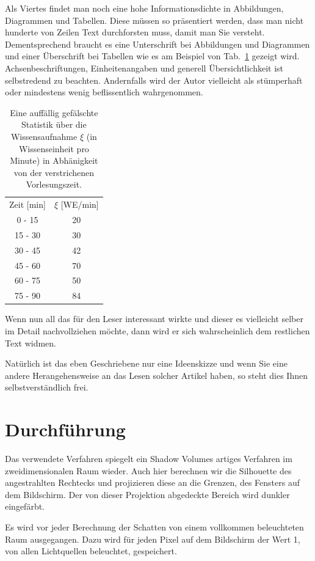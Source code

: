 \documentclass[10pt,twocolumn]{scrartcl}
\begin{document}
Als Viertes findet man noch eine hohe Informationsdichte in
Abbildungen, Diagrammen und Tabellen. Diese müssen so präsentiert werden,
dass man nicht hunderte von Zeilen Text durchforsten muss, damit man Sie versteht.
Dementsprechend braucht es eine Unterschrift bei Abbildungen und Diagrammen 
und einer Überschrift bei Tabellen wie es am Beispiel von Tab.~\ref{tab:falsch}
gezeigt wird. Achsenbeschriftungen, Einheitenangaben
und generell Übersichtlichkeit ist selbstredend zu beachten.
Andernfalls wird der Autor vielleicht als stümperhaft oder mindestens
wenig beflissentlich wahrgenommen.

\begin{table}[t]
\caption{Eine auffällig gefälschte Statistik über die Wissensaufnahme $\xi$
(in Wissenseinheit pro Minute) in Abhänigkeit von der verstrichenen Vorlesungszeit.}
\label{tab:falsch}
\centering
\begin{tabular}{cc}
\rowcolor{dunkelgrau}
Zeit [min] & $\xi$ [WE/min] \\
0 - 15 & 20 \\
\rowcolor{grau}
15 - 30 & 30 \\
30 - 45 & 42 \\
\rowcolor{grau}
45 - 60 & 70 \\
60 - 75 & 50 \\
\rowcolor{grau}
75 - 90 & 84
\end{tabular}
\end{table}

Wenn nun all das für den Leser interessant wirkte und dieser es vielleicht
selber im Detail nachvollziehen möchte, dann wird er sich wahrscheinlich
dem restlichen Text widmen.

Natürlich ist das eben Geschriebene nur eine Ideenskizze und wenn
Sie eine andere Herangehensweise an das Lesen solcher Artikel haben,
so steht dies Ihnen selbstverständlich frei.

\section{Durchführung}

Das verwendete Verfahren spiegelt ein Shadow Volumes artiges Verfahren im zweidimensionalen Raum wieder. Auch hier berechnen wir die Silhouette des angestrahlten Rechtecks und projizieren diese an die Grenzen, des Fensters auf dem Bildschirm. Der von dieser Projektion abgedeckte Bereich wird dunkler eingefärbt.

Es wird vor jeder Berechnung der Schatten von einem vollkommen beleuchteten Raum ausgegangen. Dazu wird für jeden Pixel auf dem Bildschirm der Wert 1, von allen Lichtquellen beleuchtet, gespeichert.
\end{document}
